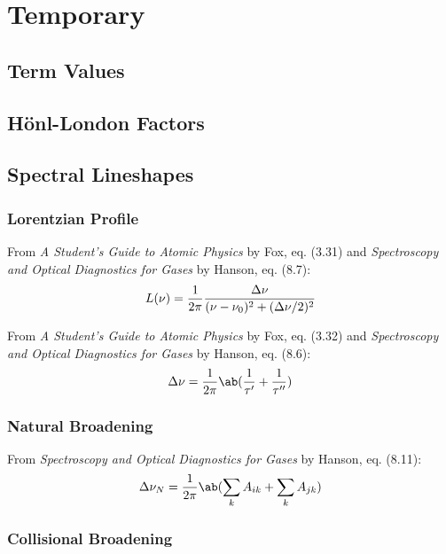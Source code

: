 \documentclass[11pt, twoside, fleqn]{report}
\begin{document}
\chapter{Temporary}

\section{Term Values}

\section{H\"onl-London Factors}

\section{Spectral Lineshapes}

\subsection{Lorentzian Profile}

From \textit{A Student's Guide to Atomic Physics} by Fox, eq. (3.31) and \textit{Spectroscopy and Optical Diagnostics for Gases} by Hanson, eq. (8.7):
\begin{equation*}
    L(\nu) = \frac{1}{2\pi}\frac{\adif{\nu}}{(\nu - \nu_0)^2 + (\adif{\nu}/2)^2}
\end{equation*}

From \textit{A Student's Guide to Atomic Physics} by Fox, eq. (3.32) and \textit{Spectroscopy and Optical Diagnostics for Gases} by Hanson, eq. (8.6):
\begin{equation*}
    \adif{\nu} = \frac{1}{2\pi}\ab(\frac{1}{\tau'} + \frac{1}{\tau''})
\end{equation*}

\subsection{Natural Broadening}

From \textit{Spectroscopy and Optical Diagnostics for Gases} by Hanson, eq. (8.11):
\begin{equation*}
    \adif{\nu}_N = \frac{1}{2\pi}\ab(\sum_k A_{ik} + \sum_k A_{jk})
\end{equation*}

\subsection{Collisional Broadening}
\end{document}
